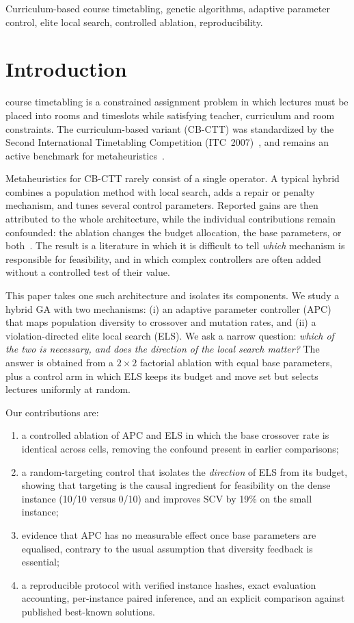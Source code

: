 \documentclass[journal]{IEEEtran}
\begin{document}
\begin{IEEEkeywords}
Curriculum-based course timetabling, genetic algorithms, adaptive parameter control, elite local search, controlled ablation, reproducibility.
\end{IEEEkeywords}

\section{Introduction}
 course timetabling is a constrained assignment problem in which lectures must be placed into rooms and timeslots while satisfying teacher, curriculum and room constraints. The curriculum-based variant (CB-CTT) was standardized by the Second International Timetabling Competition (ITC~2007)~\cite{mccollum2009setting,bonutti2012benchmarking}, and remains an active benchmark for metaheuristics~\cite{bettinelli2015survey,chen2021survey}.

Metaheuristics for CB-CTT rarely consist of a single operator. A typical hybrid combines a population method with local search, adds a repair or penalty mechanism, and tunes several control parameters. Reported gains are then attributed to the whole architecture, while the individual contributions remain confounded: the ablation changes the budget allocation, the base parameters, or both~\cite{eiben1999parameter}. The result is a literature in which it is difficult to tell \emph{which} mechanism is responsible for feasibility, and in which complex controllers are often added without a controlled test of their value.

This paper takes one such architecture and isolates its components. We study a hybrid GA with two mechanisms: (i) an adaptive parameter controller (APC) that maps population diversity to crossover and mutation rates, and (ii) a violation-directed elite local search (ELS). We ask a narrow question: \emph{which of the two is necessary, and does the direction of the local search matter?} The answer is obtained from a $2\times2$ factorial ablation with equal base parameters, plus a control arm in which ELS keeps its budget and move set but selects lectures uniformly at random.

Our contributions are:
\begin{enumerate}
    \item a controlled ablation of APC and ELS in which the base crossover rate is identical across cells, removing the confound present in earlier comparisons;
    \item a random-targeting control that isolates the \emph{direction} of ELS from its budget, showing that targeting is the causal ingredient for feasibility on the dense instance (10/10 versus 0/10) and improves SCV by 19\% on the small instance;
    \item evidence that APC has no measurable effect once base parameters are equalised, contrary to the usual assumption that diversity feedback is essential;
    \item a reproducible protocol with verified instance hashes, exact evaluation accounting, per-instance paired inference, and an explicit comparison against published best-known solutions.
\end{enumerate}
\end{document}
